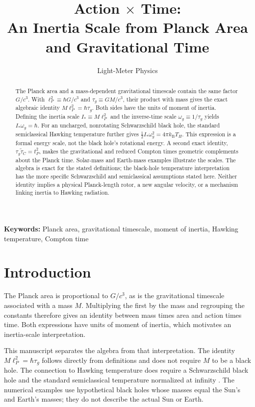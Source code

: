 \documentclass[12pt]{article}
\title{Action $\times$ Time:\\
An Inertia Scale from Planck Area and Gravitational Time}
\author{Light-Meter Physics}
\date{}
\begin{document}
\maketitle

\begin{abstract}
The Planck area and a mass-dependent gravitational timescale contain the same factor $G/c^3$. With $\ell_P^2\equiv\hbar G/c^3$ and $\tau_g\equiv GM/c^3$, their product with mass gives the exact algebraic identity $M\ell_P^2=\hbar\tau_g$. Both sides have the units of moment of inertia. Defining the inertia scale $I_*\equiv M\ell_P^2$ and the inverse-time scale $\omega_g\equiv1/\tau_g$ yields $I_*\omega_g=\hbar$. For an uncharged, nonrotating Schwarzschild black hole, the standard semiclassical Hawking temperature further gives $\tfrac12 I_*\omega_g^2=4\pi k_{\mathrm B}T_H$. This expression is a formal energy scale, not the black hole's rotational energy. A second exact identity, $\tau_g\tilde{\tau}_C=t_P^2$, makes the gravitational and reduced Compton times geometric complements about the Planck time. Solar-mass and Earth-mass examples illustrate the scales. The algebra is exact for the stated definitions; the black-hole temperature interpretation has the more specific Schwarzschild and semiclassical assumptions stated here. Neither identity implies a physical Planck-length rotor, a new angular velocity, or a mechanism linking inertia to Hawking radiation.
\end{abstract}

\noindent\textbf{Keywords:} Planck area, gravitational timescale, moment of inertia, Hawking temperature, Compton time

\section{Introduction}

The Planck area is proportional to $G/c^3$, as is the gravitational timescale associated with a mass $M$. Multiplying the first by the mass and regrouping the constants therefore gives an identity between mass times area and action times time. Both expressions have units of moment of inertia, which motivates an inertia-scale interpretation.

This manuscript separates the algebra from that interpretation. The identity $M\ell_P^2=\hbar\tau_g$ follows directly from definitions and does not require $M$ to be a black hole. The connection to Hawking temperature does require a Schwarzschild black hole and the standard semiclassical temperature normalized at infinity \cite{Hawking}. The numerical examples use hypothetical black holes whose masses equal the Sun's and Earth's masses; they do not describe the actual Sun or Earth.
\end{document}
